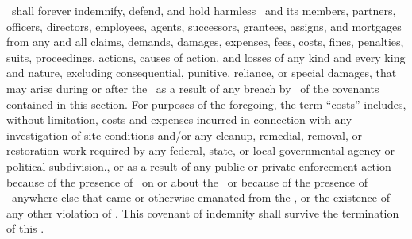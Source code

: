 \lessee\ shall forever indemnify, defend, and hold harmless \lessor\ and its members, partners, officers, directors, employees, agents, successors, grantees, assigns, and mortgages from any and all claims, demands, damages, expenses, fees, costs, fines, penalties, suits, proceedings, actions, causes of action, and losses of any kind and every king and nature, excluding consequential, punitive, reliance, or special damages, that may arise during or after the \termoflease\ as a result of any breach by \lessee\ of the covenants contained in this section. For purposes of the foregoing, the term “costs” includes, without limitation, costs and expenses incurred in connection with any investigation of site conditions and/or any cleanup, remedial, removal, or restoration work required by any federal, state, or local governmental agency or political subdivision., or as a result of any public or private enforcement action because of the presence of \hazardoussubstances\ on or about the \property\ or because of the presence of \hazardoussubstances\ anywhere else that came or otherwise emanated from the \property, or the existence of any other violation of \environmentallaw. This covenant of indemnity shall survive the termination of this \amendmentTitle.
